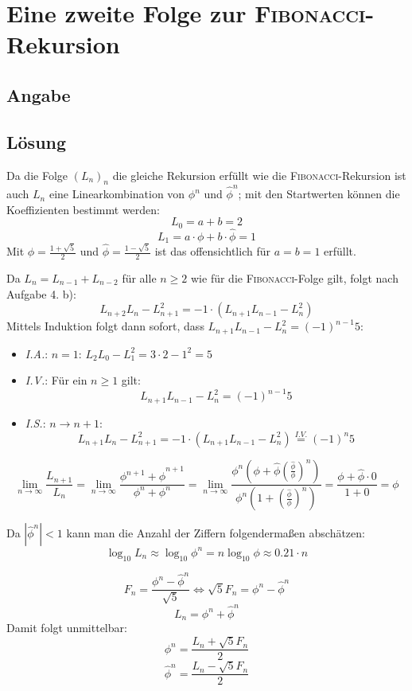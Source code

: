 \section*{Eine zweite Folge zur \textsc{Fibonacci}-Rekursion}
\subsection*{Angabe}


\subsection*{Lösung}
\begin{flushenum}
\item
	Da die Folge $(L_n)_n$ die gleiche Rekursion erfüllt wie die \textsc{Fibonacci}-Rekursion
	ist auch $L_n$ eine Linearkombination von $\phi^n$ und $\hat\phi^n$; mit den Startwerten
	können die Koeffizienten bestimmt werden:
	\[ L_0 = a + b = 2 \]
	\[ L_1 = a \cdot \phi + b\cdot \hat\phi = 1 \]
	Mit $\phi = \frac{1 + \sqrt{5}}{2}$ und $\widehat{\phi} = \frac{1 - \sqrt{5}}{2}$ ist das offensichtlich für $a = b = 1$ erfüllt.

\item 
	Da $L_n = L_{n-1} + L_{n-2}$ für alle $n \geq 2$ wie für die \textsc{Fibonacci}-Folge gilt, folgt nach Aufgabe 4. b):
	\[ L_{n+2}L_n  - L_{n+1}^2 = -1 \cdot (L_{n+1}L_{n-1} - L_n^2) \]
	Mittels Induktion folgt dann sofort, dass $L_{n+1}L_{n-1} - L_n^2 = (-1)^{n-1}5$:
	\begin{itemize}
		\item \textit{I.A.}: $n = 1$: $L_2L_0 - L_1^2 = 3 \cdot 2 - 1^2 = 5$
		\item \textit{I.V.}: Für ein $n \geq 1$ gilt:
			\[ L_{n+1}L_{n-1} - L_n^2 = (-1)^{n-1} 5 \]
		\item \textit{I.S.}: $n \rightarrow n+1$:
			\[ L_{n+1}L_n - L_{n+1}^2 = -1 \cdot (L_{n+1}L_{n-1} - L_n^2) \overset{I.V.}{=} (-1)^n 5 \]
	\end{itemize}

\item
	\[ \lim_{n \rightarrow \infty} \frac{L_{n+1}}{L_n} =
	   \lim_{n \rightarrow \infty} \frac{\phi^{n+1} + \hat\phi^{n+1}}{\phi^n + \phi^n} =
	   \lim_{n \rightarrow \infty} \frac{\phi^n \left(\phi + \hat\phi \left( \frac{\hat\phi}{\phi}\right)^n \right)}
	   				    {\phi^n \left( 1 + \left(\frac{\hat\phi}{\phi}\right)^n \right)} =
	   \frac{\phi + \hat\phi \cdot 0}{1 + 0} = \phi \]

\item Da $|\hat\phi^n| < 1$ kann man die Anzahl der Ziffern folgendermaßen abschätzen:
	\[ \log_ {10} L_n \approx \log_{10} \phi^n = n \log_{10} \phi \approx 0.21 \cdot n \]

\item
	\[ F_n = \frac{\phi^n - \hat\phi^n}{\sqrt{5}} \Leftrightarrow \sqrt{5} F_n = \phi^n - \hat\phi^n \]
	\[ L_n = \phi^n + \hat\phi^n \]
	Damit folgt unmittelbar:
	\[ \phi^n = \frac{L_n + \sqrt{5} F_n}{2} \]
	\[ \hat\phi^n = \frac{L_n - \sqrt{5} F_n}{2} \]
\end{flushenum}
